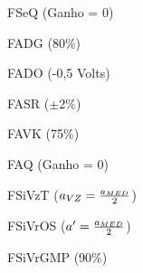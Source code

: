 \begin{figure}[htb]
\footnotesize
\centering

\vspace{1cm}
\caption{FSeQ (Ganho = 0)}
\label{fig:fseq}
\end{figure}

\begin{figure}[htb]
\footnotesize
\centering

\vspace{1cm}
\caption{FADG (80\%)}
\label{fig:fadg}
\end{figure}

\begin{figure}[htb]
\footnotesize
\centering

\vspace{1cm}
\caption{FADO (-0,5 Volts)}
\label{fig:fado}
\end{figure}

\begin{figure}[htb]
\footnotesize
\centering

\vspace{1cm}
\caption{FASR ($\pm 2\%$)}
\label{fig:fasr}
\end{figure}

\begin{figure}[htb]
\footnotesize
\centering

\vspace{1cm}
\caption{FAVK (75\%)}
\label{fig:favk}
\end{figure}

\begin{figure}[htb]
\footnotesize
\centering

\vspace{1cm}
\caption{FAQ (Ganho = 0)}
\label{fig:faq}
\end{figure}

\begin{figure}[htb]
\footnotesize
\centering

\vspace{1cm}
\caption{FSiVzT ($a_{\tiny VZ} = \frac{a_{\tiny MED}}{2}$)}
\label{fig:fsivzt}
\end{figure}

\begin{figure}[htb]
\footnotesize
\centering

\vspace{1cm}
\caption{FSiVrOS ($a' = \frac{a_{\tiny MED}}{2}$)}
\label{fig:fsivros}
\end{figure}

\begin{figure}[htb]
\footnotesize
\centering

\vspace{1cm}
\caption{FSiVrGMP (90\%)}
\label{fig:fsivrgmp}
\end{figure}

